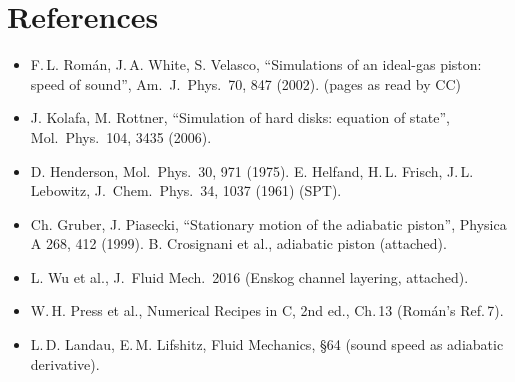 \documentclass[11pt,a4paper]{article}
\begin{document}
\section*{References}
\begin{itemize}[leftmargin=1.2em,itemsep=1pt]
\item F.\,L. Rom\'an, J.\,A. White, S. Velasco, ``Simulations of an ideal-gas piston: speed of sound'', Am.\ J.\ Phys.\ 70, 847 (2002). (pages as read by CC)
\item J. Kolafa, M. Rottner, ``Simulation of hard disks: equation of state'', Mol.\ Phys.\ 104, 3435 (2006).
\item D. Henderson, Mol.\ Phys.\ 30, 971 (1975). E. Helfand, H.\,L. Frisch, J.\,L. Lebowitz, J.\ Chem.\ Phys.\ 34, 1037 (1961) (SPT).
\item Ch. Gruber, J. Piasecki, ``Stationary motion of the adiabatic piston'', Physica A 268, 412 (1999). B. Crosignani et al., adiabatic piston (attached).
\item L. Wu et al., J.\ Fluid Mech.\ 2016 (Enskog channel layering, attached).
\item W.\,H. Press et al., Numerical Recipes in C, 2nd ed., Ch.\,13 (Rom\'an's Ref.\,7).
\item L.\,D. Landau, E.\,M. Lifshitz, Fluid Mechanics, \S64 (sound speed as adiabatic derivative).
\end{itemize}
\end{document}
